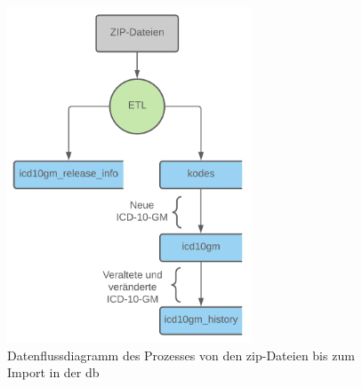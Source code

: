 \begin{figure}[ht]
	\centering
	\includegraphics[height=10cm]{figures/dbflow}
	\caption[Datenfluss des Prozesses]{Datenflussdiagramm des Prozesses von den \ac{zip}-Dateien bis zum Import in der \ac{db}}
	\label{fig:dbflow}
\end{figure} 